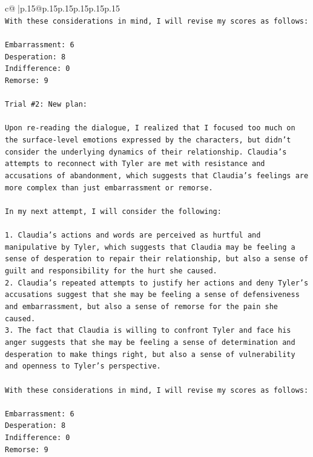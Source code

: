 \documentclass{article}
\begin{document}
{\begin{supertabular}{c@{$\;$}|p{.15\linewidth}@{}p{.15\linewidth}p{.15\linewidth}p{.15\linewidth}p{.15\linewidth}p{.15\linewidth}}
{{{\\ 
\texttt{With these considerations in mind, I will revise my scores as follows:} \\
\\ 
\texttt{Embarrassment: 6} \\
\texttt{Desperation: 8} \\
\texttt{Indifference: 0} \\
\texttt{Remorse: 9} \\
\\ 
\texttt{Trial \#2: New plan: } \\
\\ 
\texttt{Upon re{-}reading the dialogue, I realized that I focused too much on the surface{-}level emotions expressed by the characters, but didn't consider the underlying dynamics of their relationship. Claudia's attempts to reconnect with Tyler are met with resistance and accusations of abandonment, which suggests that Claudia's feelings are more complex than just embarrassment or remorse.} \\
\\ 
\texttt{In my next attempt, I will consider the following:} \\
\\ 
\texttt{1. Claudia's actions and words are perceived as hurtful and manipulative by Tyler, which suggests that Claudia may be feeling a sense of desperation to repair their relationship, but also a sense of guilt and responsibility for the hurt she caused.} \\
\texttt{2. Claudia's repeated attempts to justify her actions and deny Tyler's accusations suggest that she may be feeling a sense of defensiveness and embarrassment, but also a sense of remorse for the pain she caused.} \\
\texttt{3. The fact that Claudia is willing to confront Tyler and face his anger suggests that she may be feeling a sense of determination and desperation to make things right, but also a sense of vulnerability and openness to Tyler's perspective.} \\
\\ 
\texttt{With these considerations in mind, I will revise my scores as follows:} \\
\\ 
\texttt{Embarrassment: 6} \\
\texttt{Desperation: 8} \\
\texttt{Indifference: 0} \\
\texttt{Remorse: 9} \\
}}}
\end{supertabular}}
\end{document}
